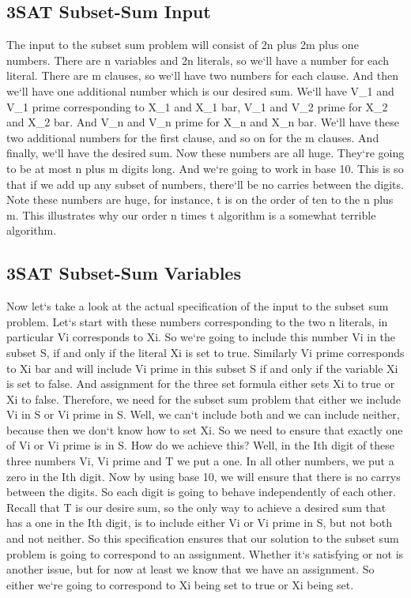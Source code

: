 \subsection{3SAT Subset-Sum  Input}
The input to the subset sum problem will consist of 2n plus 2m plus one numbers.
There are n variables and 2n literals, so we`ll have a number for each literal.
There are m clauses, so we`ll have two numbers for each clause.
And then we`ll have one additional number which is our desired sum.
We`ll have V\_1 and V\_1 prime corresponding to X\_1 and X\_1 bar, V\_1 and V\_2 prime for X\_2 and X\_2 bar.
And V\_n and V\_n prime for X\_n and X\_n bar.
We`ll have these two additional numbers for the first clause, and so on for the m clauses.
And finally, we`ll have the desired sum.
Now these numbers are all huge.
They`re going to be at most n plus m digits long.
And we`re going to work in base 10.
This is so that if we add up any subset of numbers, there`ll be no carries between the digits.
Note these numbers are huge, for instance, t is on the order of ten to the n plus m.
This illustrates why our order n times t algorithm is a somewhat terrible algorithm.

\subsection{3SAT Subset-Sum  Variables}
Now let`s take a look at the actual specification of the input to the subset sum problem.
Let`s start with these numbers corresponding to the two n literals, in particular Vi corresponds to Xi.
So we`re going to include this number Vi in the subset S, if and only if the literal Xi is set to true.
Similarly Vi prime corresponds to Xi bar and will include Vi prime in this subset S if and only if the variable Xi is set to false.
And assignment for the three set formula either sets Xi to true or Xi to false.
Therefore, we need for the subset sum problem that either we include Vi in S or Vi prime in S\@.
Well, we can`t include both and we can include neither, because then we don`t know how to set Xi.
So we need to ensure that exactly one of Vi or Vi prime is in S\@.
How do we achieve this? Well, in the Ith digit of these three numbers Vi, Vi prime and T we put a one.
In all other numbers, we put a zero in the Ith digit.
Now by using base 10, we will ensure that there is no carrys between the digits.
So each digit is going to behave independently of each other.
Recall that T is our desire sum, so the only way to achieve a desired sum that has a one in the Ith digit, is to include either Vi or Vi prime in S, but not both and not neither.
So this specification ensures that our solution to the subset sum problem is going to correspond to an assignment.
Whether it`s satisfying or not is another issue, but for now at least we know that we have an assignment.
So either we`re going to correspond to Xi being set to true or Xi being set.

